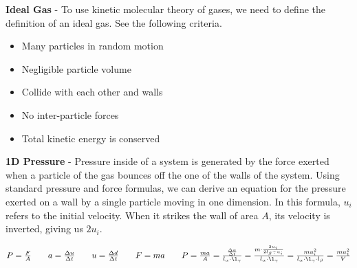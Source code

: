 \documentclass{article}
\begin{document}
	
	\begin{minipage}{4.4cm}
	\end{minipage}
	\begin{minipage}{11.8cm}
		\textbf{Ideal Gas} - To use kinetic molecular theory of gases, we need to define the definition of an ideal gas. See the following criteria.
		\begin{itemize}
			\item Many particles in random motion
			\item Negligible particle volume
			\item Collide with each other and walls
			\item No inter-particle forces
			\item Total kinetic energy is conserved
		\end{itemize}
	\end{minipage}
	
	\vspace{10pt}
	\noindent\textbf{1D Pressure} - Pressure inside of a system is generated by the force exerted when a particle of the gas bounces off the one of the walls of the system. Using standard pressure and force formulas, we can derive an equation for the pressure exerted on a wall by a single particle moving in one dimension. In this formula, $u_i$ refers to the initial velocity. When it strikes the wall of area $A$, its velocity is inverted, giving us $2u_i$. \\
	\begin{qq}
		
		\begin{center}
			$P=\frac{F}{A} \quad\quad a=\frac{\Delta u}{\Delta t} \quad\quad u=\frac{\Delta d}{\Delta t} \quad\quad F=ma \quad\quad P=\frac{ma}{A}=\frac{\frac{\Delta u}{\Delta t}}{l_\alpha\cdot\l_\gamma}=\frac{m\cdot\frac{2u_i}{2l_\beta \div u_i} }{l_\alpha\cdot\l_\gamma}=\frac{mu_i^2}{l_\alpha\cdot\l_\gamma\cdot l_\beta}=\frac{mu_1^2}{V} $
		\end{center}
		
	\end{qq}
	
	\pagebreak
	
\end{document}
